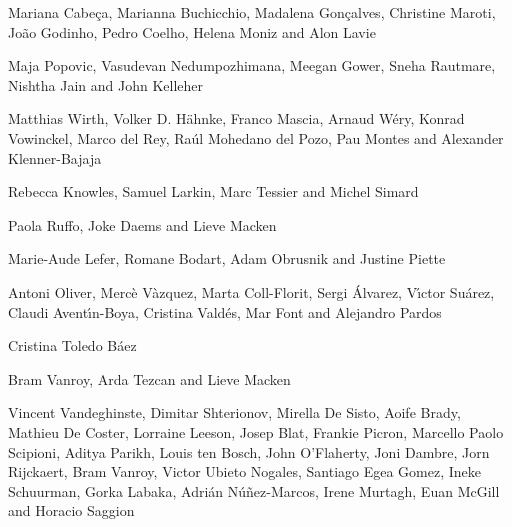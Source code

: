 %
    {Mariana Cabe\c{c}a, Marianna Buchicchio, Madalena Gon\c{c}alves, Christine Maroti, Jo\~{a}o Godinho, Pedro Coelho, Helena Moniz and Alon Lavie}

%
    {Maja Popovic, Vasudevan Nedumpozhimana, Meegan Gower, Sneha Rautmare, Nishtha Jain and John Kelleher}

%
    {Matthias Wirth, Volker D. H\"{a}hnke, Franco Mascia, Arnaud W\'{e}ry, Konrad Vowinckel, Marco del Rey, Ra\'{u}l Mohedano del Pozo, Pau Montes and Alexander Klenner-Bajaja}

%
    {Rebecca Knowles, Samuel Larkin, Marc Tessier and Michel Simard}

%
    {Paola Ruffo, Joke Daems and Lieve Macken}

%
    {Marie-Aude Lefer, Romane Bodart, Adam Obrusnik and Justine Piette}

%
    {Antoni Oliver, Merc\`{e} V\`{a}zquez, Marta Coll-Florit, Sergi \'{A}lvarez, V\'{\i}ctor Su\'{a}rez, Claudi Avent\'{\i}n-Boya, Cristina Vald\'{e}s, Mar Font and Alejandro Pardos}

%
    {Cristina Toledo B\'{a}ez}

%
    {Bram Vanroy, Arda Tezcan and Lieve Macken}

%
    {Vincent Vandeghinste, Dimitar Shterionov, Mirella De Sisto, Aoife Brady, Mathieu De Coster, Lorraine Leeson, Josep Blat, Frankie Picron, Marcello Paolo Scipioni, Aditya Parikh, Louis ten Bosch, John O'Flaherty, Joni Dambre, Jorn Rijckaert, Bram Vanroy, Victor Ubieto Nogales, Santiago Egea Gomez, Ineke Schuurman, Gorka Labaka, Adri\'{a}n N\'{u}\~{n}ez-Marcos, Irene Murtagh, Euan McGill and Horacio Saggion}

